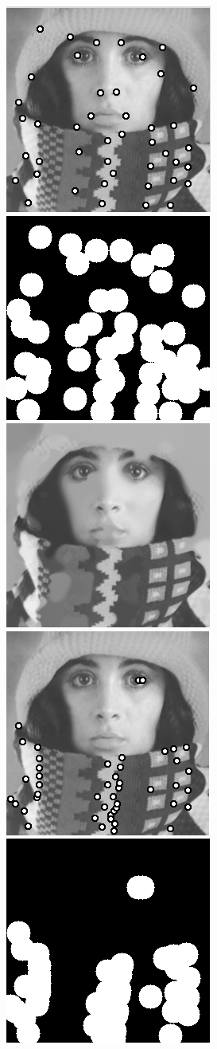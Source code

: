 \begin{figure}
    \centering
    \includegraphics[width=0.31\linewidth]{../Images/trui_corners_cnms.png}
    \includegraphics[width=0.31\linewidth]{../Images/trui-mask_cnms.png}
    \includegraphics[width=0.31\linewidth]{../Images/trui-inpaint_cnms.png}\\
    \vspace{0.2cm}
    \includegraphics[width=0.31\linewidth]{../Images/trui_corners_non_cnms.png}
    \includegraphics[width=0.31\linewidth]{../Images/trui-mask_non_cnms.png}

\end{figure}
